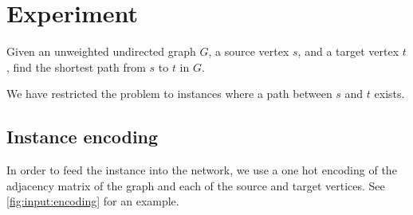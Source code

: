 
\section{Experiment}
Given an unweighted undirected graph $G$, a source vertex $s$, and a target vertex $t$, find the shortest path from $s$ to $t$ in $G$.

\newpar We have restricted the problem to instances where a path between $s$ and $t$ exists.

\subsection{Instance encoding}
In order to feed the instance into the network, we use a one hot encoding of the adjacency matrix of the graph and each of the source and target vertices. See \autoref{fig:input:encoding} for an example.


